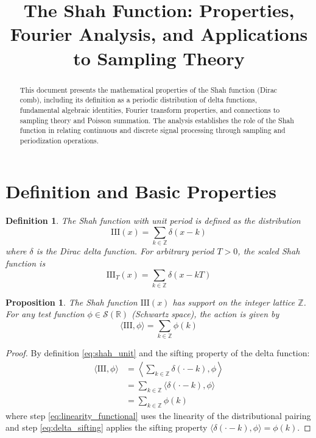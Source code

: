 \documentclass{article}
\title{The Shah Function: Properties, Fourier Analysis, and Applications to Sampling Theory}
\author{}
\date{}
\newtheorem{proposition}{Proposition}
\newtheorem{definition}{Definition}
\begin{document}
\maketitle

\begin{abstract}
This document presents the mathematical properties of the Shah function (Dirac comb), including its definition as a periodic distribution of delta functions, fundamental algebraic identities, Fourier transform properties, and connections to sampling theory and Poisson summation. The analysis establishes the role of the Shah function in relating continuous and discrete signal processing through sampling and periodization operations.
\end{abstract}

\section{Definition and Basic Properties}

\begin{definition}
\label{def:shah_function}
The Shah function with unit period is defined as the distribution
\begin{equation}
\label{eq:shah_unit}
\text{III}(x) = \sum_{k \in \mathbb{Z}} \delta(x - k)
\end{equation}
where $\delta$ is the Dirac delta function. For arbitrary period $T > 0$, the scaled Shah function is
\begin{equation}
\label{eq:shah_period_T}
\text{III}_T(x) = \sum_{k \in \mathbb{Z}} \delta(x - kT)
\end{equation}
\end{definition}

\begin{proposition}
\label{prop:shah_support}
The Shah function $\text{III}(x)$ has support on the integer lattice $\mathbb{Z}$. For any test function $\phi \in \mathcal{S}(\mathbb{R})$ (Schwartz space), the action is given by
\begin{equation}
\label{eq:shah_action}
\langle \text{III}, \phi \rangle = \sum_{k \in \mathbb{Z}} \phi(k)
\end{equation}
\end{proposition}

\begin{proof}
By definition \eqref{eq:shah_unit} and the sifting property of the delta function:
\begin{align}
\langle \text{III}, \phi \rangle &= \left\langle \sum_{k \in \mathbb{Z}} \delta(\cdot - k), \phi \right\rangle \label{eq:shah_action_expand}\\
&= \sum_{k \in \mathbb{Z}} \langle \delta(\cdot - k), \phi \rangle \label{eq:linearity_functional}\\
&= \sum_{k \in \mathbb{Z}} \phi(k) \label{eq:delta_sifting}
\end{align}
where step \eqref{eq:linearity_functional} uses the linearity of the distributional pairing and step \eqref{eq:delta_sifting} applies the sifting property $\langle \delta(\cdot - k), \phi \rangle = \phi(k)$.
\end{proof}
\end{document}
